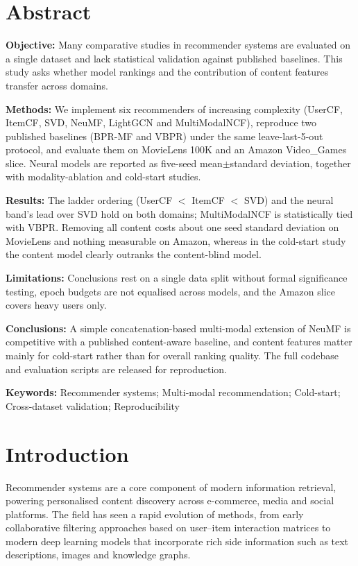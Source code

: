 \documentclass[11pt,a4paper]{article}
\newcommand{\absfont}{\fontsize{9}{12}\selectfont}
\begin{document}
\section*{Abstract}
{\absfont
\textbf{Objective:} Many comparative studies in recommender systems are
evaluated on a single dataset and lack statistical validation against published
baselines. This study asks whether model rankings and the contribution of
content features transfer across domains.\par
\textbf{Methods:} We implement six recommenders of increasing complexity
(UserCF, ItemCF, SVD, NeuMF, LightGCN and MultiModalNCF), reproduce two
published baselines (BPR-MF and VBPR) under the same leave-last-5-out protocol,
and evaluate them on MovieLens 100K and an Amazon Video\_Games slice. Neural
models are reported as five-seed mean$\pm$standard deviation, together with
modality-ablation and cold-start studies.\par
\textbf{Results:} The ladder ordering (UserCF $<$ ItemCF $<$ SVD) and the neural
band's lead over SVD hold on both domains; MultiModalNCF is statistically tied
with VBPR. Removing all content costs about one seed standard deviation on
MovieLens and nothing measurable on Amazon, whereas in the cold-start study the
content model clearly outranks the content-blind model.\par
\textbf{Limitations:} Conclusions rest on a single data split without formal
significance testing, epoch budgets are not equalised across models, and the
Amazon slice covers heavy users only.\par
\textbf{Conclusions:} A simple concatenation-based multi-modal extension of
NeuMF is competitive with a published content-aware baseline, and content
features matter mainly for cold-start rather than for overall ranking quality.
The full codebase and evaluation scripts are released for reproduction.\par}

\vspace{6pt}
{\fontsize{10.5}{13}\selectfont
\textbf{Keywords:} Recommender systems; Multi-modal recommendation; Cold-start;
Cross-dataset validation; Reproducibility\par}

\section{Introduction}
Recommender systems are a core component of modern information retrieval,
powering personalised content discovery across e-commerce, media and social
platforms. The field has seen a rapid evolution of methods, from early
collaborative filtering approaches based on user--item interaction matrices to
modern deep learning models that incorporate rich side information such as text
descriptions, images and knowledge graphs.
\end{document}
